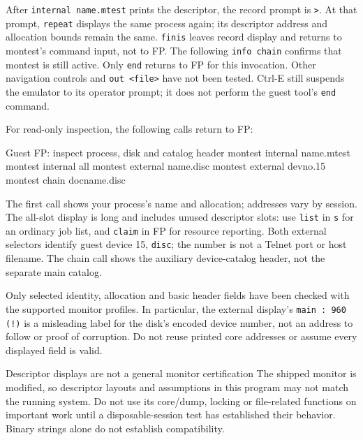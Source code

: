After \passthrough{\lstinline!internal name.mtest!} prints the descriptor, the record prompt is \passthrough{\lstinline!>!}. At that prompt, \passthrough{\lstinline!repeat!} displays the same process again; its descriptor address and allocation bounds remain the same. \passthrough{\lstinline!finis!} leaves record display and returns to montest's command input, not to FP. The following \passthrough{\lstinline!info chain!} confirms that montest is still active. Only \passthrough{\lstinline!end!} returns to FP for this invocation. Other navigation controls and \passthrough{\lstinline!out <file>!} have not been tested. Ctrl-E still suspends the emulator to its operator prompt; it does not perform the guest tool's \passthrough{\lstinline!end!} command.

For read-only inspection, the following calls return to FP:

\begin{commandexample}{Guest FP: inspect process, disk and catalog header}
montest internal name.mtest
montest internal all
montest external name.disc
montest external devno.15
montest chain docname.disc
\end{commandexample}

The first call shows your process's name and allocation; addresses vary by
session. The all-slot display is long and includes unused descriptor slots:
use \texttt{list} in \texttt{s} for an ordinary job list, and \texttt{claim}
in FP for resource reporting. Both external selectors identify guest device
15, \texttt{disc}; the number is not a Telnet port or host filename.
The chain call shows the auxiliary device-catalog header, not the separate
main catalog.

Only selected identity, allocation and basic header fields have been checked
with the supported monitor profiles. In particular, the external display's
\texttt{main : 960 (!)} is a misleading label for the disk's encoded device
number, not an address to follow or proof of corruption. Do not reuse printed
core addresses or assume every displayed field is valid.

\begin{operationnote}{Descriptor displays are not a general monitor certification}
The shipped monitor is modified, so descriptor layouts and assumptions in this program may not match the running system. Do not use its core/dump, locking or file-related functions on important work until a disposable-session test has established their behavior. Binary strings alone do not establish compatibility.
\end{operationnote}

